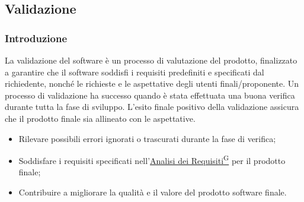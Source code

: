 \subsection{Validazione}
\subsubsection{Introduzione}
La validazione del software è un processo di valutazione del prodotto, finalizzato a garantire che il 
software soddisfi i requisiti predefiniti e specificati dal richiedente, nonché le richieste e le aspettative 
degli utenti finali/proponente. Un processo di validazione ha successo quando è stata effettuata una buona 
verifica durante tutta la fase di sviluppo.
L’esito finale positivo della validazione assicura che il prodotto finale sia allineato con le aspettative.
\begin{itemize}
    \item Rilevare possibili errori ignorati o trascurati durante la fase di verifica;
    \item Soddisfare i requisiti specificati nell’\href{https://code7crusaders.github.io/docs/PB/documentazione_interna/glossario.html#analisi-dei-requisiti}{Analisi dei Requisiti\textsuperscript{G}} per il prodotto finale;
    \item Contribuire a migliorare la qualità e il valore del prodotto software finale.
\end{itemize}


